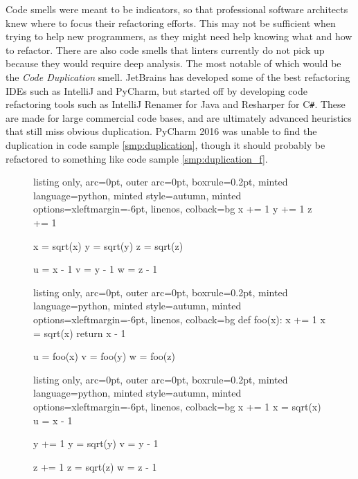 \documentclass[a4paper, 16pt, oneside]{Thesis}
\begin{document}
Code smells were meant to be indicators, so that professional software
architects knew where to focus their refactoring efforts. This may not
be sufficient when trying to help new programmers, as they might need
help knowing what and how to refactor. There are also code smells that
linters currently do not pick up because they would require deep
analysis. The most notable of which would be the \emph{Code Duplication}
smell. JetBrains has developed some of the best refactoring IDEs such as
IntelliJ and PyCharm, but started off by developing code refactoring
tools such as IntelliJ Renamer for Java and Resharper for C\texttt{\#}.
These are made for large commercial code bases, and are ultimately
advanced heuristics that still miss obvious duplication. PyCharm 2016
was unable to find the duplication in code sample \ref{smp:duplication},
though it should probably be refactored to something like code sample
\ref{smp:duplication_f}.

\begin{figure}[h]
\centering
 \begin{minipage}{0.31\textwidth}
  \begin{tcblisting}{listing only, 
  arc=0pt,
  outer arc=0pt, 
  boxrule=0.2pt,
  minted language=python,
  minted style=autumn,
  minted options={xleftmargin=-6pt, linenos},
  colback=bg }
x += 1
y += 1
z += 1

x = sqrt(x)
y = sqrt(y)
z = sqrt(z)

u = x - 1
v = y - 1
w = z - 1
\end{tcblisting}
\vspace{10pt}
\label{smp:duplication}
 \end{minipage}
 \hspace{9pt}
 \begin{minipage}{0.31\textwidth}
  \begin{tcblisting}{listing only, 
  arc=0pt,
  outer arc=0pt, 
  boxrule=0.2pt,
  minted language=python,
  minted style=autumn,
  minted options={xleftmargin=-6pt, linenos},
  colback=bg }
def foo(x):
    x += 1
    x = sqrt(x)
    return x - 1

u = foo(x)
v = foo(y)
w = foo(z)
\end{tcblisting}
\vspace{38pt}
\label{smp:duplication_f}
 \end{minipage}
 \hspace{9pt}
  \begin{minipage}{0.31\textwidth}
  \begin{tcblisting}{listing only, 
  arc=0pt,
  outer arc=0pt, 
  boxrule=0.2pt,
  minted language=python,
  minted style=autumn,
  minted options={xleftmargin=-6pt, linenos},
  colback=bg }
x += 1
x = sqrt(x)
u = x - 1

y += 1
y = sqrt(y)
v = y - 1

z += 1
z = sqrt(z)
w = z - 1
\end{tcblisting}
\label{smp:duplication_2}
 \end{minipage}
\end{figure}
\end{document}
